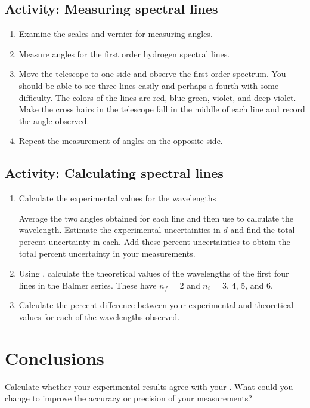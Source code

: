 	
	
\subsection{Activity: Measuring spectral lines}
\begin{enumerate}[resume]
	\item Examine the scales and vernier for measuring angles.	
	
	\item Measure angles for the first order hydrogen spectral lines.

	\clearpage
	
	\item Move the telescope to one side and observe the first order spectrum.  You should be able to see three lines easily and perhaps a fourth with some difficulty.  The colors of the lines are red, blue-green, violet, and deep violet.  Make the cross hairs in the telescope fall in the middle of each line and record the angle observed.
	\item Repeat the measurement of angles on the opposite side.
\end{enumerate}
	
\subsection{Activity: Calculating spectral lines}
\begin{enumerate}[resume]
	\item Calculate the experimental values for the wavelengths
	
	Average the two angles obtained for each line and then use  to calculate the wavelength.  Estimate the experimental uncertainties in $d$ and find the total percent uncertainty in each.  Add these percent uncertainties to obtain the total percent uncertainty in your measurements.
	\item Using , calculate the theoretical values of the wavelengths of the first four lines in the Balmer series.  These have $n_f$ = 2 and $n_i$ = 3, 4, 5, and 6.
	\item Calculate the percent difference between your experimental and theoretical values for each of the wavelengths observed. 
\end{enumerate}

\section{Conclusions}
Calculate whether your experimental results agree with your .  What could you change to improve the accuracy or precision of your measurements?


\endinput